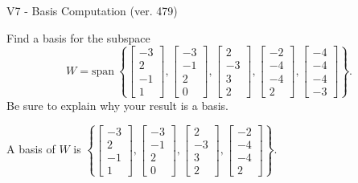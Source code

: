 \begin{exercise}
  \begin{exerciseTitle}V7 - Basis Computation (ver. 479)\end{exerciseTitle}
  \begin{exerciseStatement}
    Find a basis for the subspace 
\[W=\mathrm{span}\ \left\{\left[\begin{array}{r}
-3 \\
2 \\
-1 \\
1
\end{array}\right] , \left[\begin{array}{r}
-3 \\
-1 \\
2 \\
0
\end{array}\right] , \left[\begin{array}{r}
2 \\
-3 \\
3 \\
2
\end{array}\right] , \left[\begin{array}{r}
-2 \\
-4 \\
-4 \\
2
\end{array}\right] , \left[\begin{array}{r}
-4 \\
-4 \\
-4 \\
-3
\end{array}\right]\right\}.\]
 Be sure to explain why your result is a basis.


  \end{exerciseStatement}
  \begin{exerciseAnswer}
   A basis of \(W\) is  \(\left\{\left[\begin{array}{r}
-3 \\
2 \\
-1 \\
1
\end{array}\right] , \left[\begin{array}{r}
-3 \\
-1 \\
2 \\
0
\end{array}\right] , \left[\begin{array}{r}
2 \\
-3 \\
3 \\
2
\end{array}\right] , \left[\begin{array}{r}
-2 \\
-4 \\
-4 \\
2
\end{array}\right]\right\}\).
  


  \end{exerciseAnswer}
\end{exercise}
